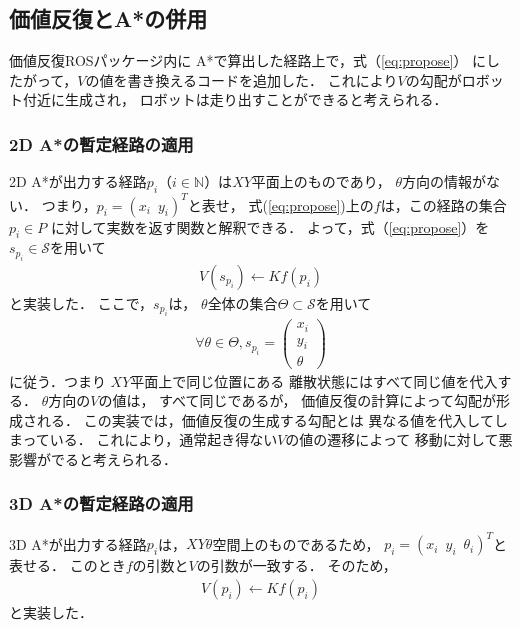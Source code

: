 \subsection{価値反復とA*の併用}
価値反復ROSパッケージ内に
A*で算出した経路上で，式（\ref{eq:propose}）
にしたがって，$V$の値を書き換えるコードを追加した．
これにより$V$の勾配がロボット付近に生成され，
ロボットは走り出すことができると考えられる．

\subsubsection{2D A*の暫定経路の適用}
2D A*が出力する経路$p_i$（$i \in \mathbb N $）は$XY$平面上のものであり，
$\theta$方向の情報がない．
つまり，$p_i = (x_i \; \:  y_i)^T$と表せ，
式(\ref{eq:propose})上の$f$は，この経路の集合$p_i \in P$
に対して実数を返す関数と解釈できる．
よって，式（\ref{eq:propose}）を$ s_{p_i} \in \mathcal{S}$を用いて
\begin{align}
	V \left ( s_{p_i} \right)
	 	\longleftarrow K f \left ( p_i \right )
	\label{eq:propose2d}
\end{align}
と実装した．
ここで，$ s_{p_i} $は，
$\theta$全体の集合$\Theta \subset \mathcal{S}$を用いて
\begin{align}
	\forall \theta \in \Theta , s_{p_i} = \begin{pmatrix} x_i \\ y_i \\ \theta \end{pmatrix} 
\end{align}
に従う．つまり
$XY$平面上で同じ位置にある
離散状態にはすべて同じ値を代入する．
$\theta$方向の$V$の値は，
すべて同じであるが，
価値反復の計算によって勾配が形成される．
この実装では，価値反復の生成する勾配とは
異なる値を代入してしまっている．
これにより，通常起き得ない$V$の値の遷移によって
移動に対して悪影響がでると考えられる．

\subsubsection{3D A*の暫定経路の適用}
3D A*が出力する経路$p_i$は，$XY\theta$空間上のものであるため，
$p_i = (x_i \; \:  y_i \;\: \theta_i )^T$と表せる．
このとき$f$の引数と$V$の引数が一致する．
そのため，
\begin{align}
	V \left ( p_i \right )
	 	\longleftarrow K f \left ( p_i \right )
	\label{eq:propose3d}
\end{align}
と実装した．


